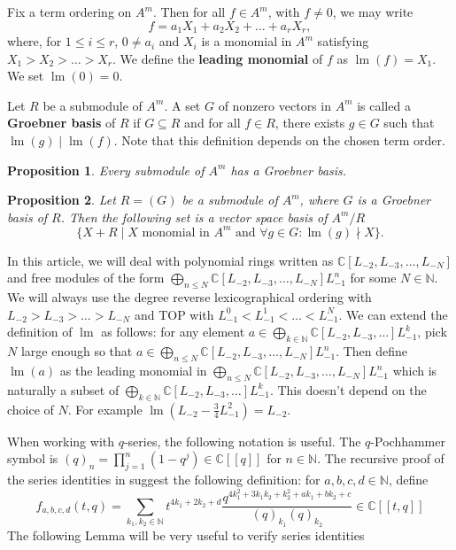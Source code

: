 \documentclass[12pt, a4paper]{article}
\newtheorem{proposition}{Proposition}
\DeclareMathOperator{\lm}{lm}
\begin{document}
Fix a term ordering on $A^m$.
Then for all $f \in A^m$, with $f \neq 0$, we may write
\begin{equation*}
  f = a_1X_1 + a_2X_2 + \dots + a_rX_r,
\end{equation*}
where, for $1 \le i\le r$, $0 \neq a_i$ and $X_i$ is a monomial in $A^m$ satisfying $X_1 > X_2 > \dots > X_r$.
We define the \textbf{leading monomial} of $f$ as $\lm(f) = X_1$.
We set $\lm(0)=0$.

Let $R$ be a submodule of $A^m$.
A set $G$ of nonzero vectors in $A^m$ is called a \textbf{Groebner basis} of $R$ if $G \subseteq R$ and for all $f \in R$, there exists $g \in G$ such that $\lm(g) \mid \lm(f)$.
Note that this definition depends on the chosen term order.

\begin{proposition}
  \label{prp:7}
  Every submodule of $A^m$ has a Groebner basis.
\end{proposition}

\begin{proposition}
  \label{prp:8}
  Let $R=(G)$ be a submodule of $A^m$, where $G$ is a Groebner basis of $R$.
  Then the following set is a vector space basis of $A^m/R$
  \begin{equation*}
    \{X + R \mid X \text{ monomial in } A^m\text{ and } \forall g \in G: \lm(g) \nmid X\}.
  \end{equation*}
\end{proposition}

In this article, we will deal with polynomial rings written as $\mathbb{C}[L_{-2}, L_{-3}, \dots, L_{-N}]$ and free modules of the form $\bigoplus_{n \le N}\mathbb{C}[L_{-2}, L_{-3}, \dots, L_{-N}]L_{-1}^n$ for some $N \in \mathbb{N}$.
We will always use the degree reverse lexicographical ordering with $L_{-2} > L_{-3} > \dots > L_{-N}$ and TOP with $L_{-1}^0 < L_{-1}^1 < \dots < L_{-1}^N$.
We can extend the definition of $\lm$ as follows: for any element $a \in \bigoplus_{k \in \mathbb{N}}\mathbb{C}[L_{-2}, L_{-3}, \dots]L_{-1}^k$, pick $N$ large enough so that $a \in \bigoplus_{n \le N}\mathbb{C}[L_{-2}, L_{-3}, \dots, L_{-N}]L_{-1}^n$.
Then define $\lm(a)$ as the leading monomial in $\bigoplus_{n \le N}\mathbb{C}[L_{-2}, L_{-3}, \dots, L_{-N}]L_{-1}^n$ which is naturally a subset of $\bigoplus_{k \in \mathbb{N}}\mathbb{C}[L_{-2}, L_{-3}, \dots]L_{-1}^k$.
This doesn't depend on the choice of $N$.
For example $\lm(L_{-2} - \frac{3}{4}L_{-1}^2) = L_{-2}$.

When working with $q$-series, the following notation is useful.
The $q$-Pochhammer symbol is $(q)_n = \prod_{j = 1}^n(1 - q^j) \in \mathbb{C}[[q]]$ for $n \in \mathbb{N}$.
The recursive proof of the series identities in \cite{andrews_singular_2022} suggest the following definition: for $a, b, c, d \in \mathbb{N}$, define
\begin{equation*}
  f_{a, b, c, d}(t, q) = \sum_{k_1, k_2 \in \mathbb{N}}t^{4k_1 + 2k_2 + d}\frac{q^{4k_1^2 + 3k_1k_2 + k_2^2 + ak_1 + bk_2 + c}}{(q)_{k_1}(q)_{k_2}} \in \mathbb{C}[[t, q]]
\end{equation*}
The following Lemma will be very useful to verify series identities
\end{document}
